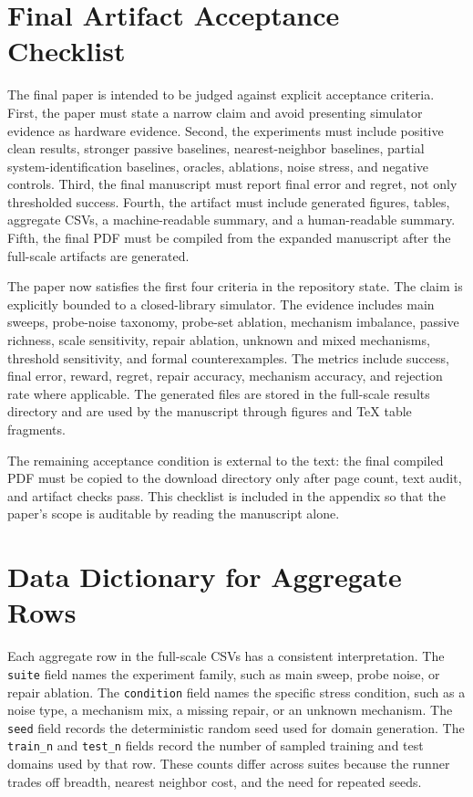 \documentclass{article}
\begin{document}
\section{Final Artifact Acceptance Checklist}

The final paper is intended to be judged against explicit acceptance criteria.
First, the paper must state a narrow claim and avoid presenting simulator
evidence as hardware evidence. Second, the experiments must include positive
clean results, stronger passive baselines, nearest-neighbor baselines, partial
system-identification baselines, oracles, ablations, noise stress, and negative
controls. Third, the final manuscript must report final error and regret, not
only thresholded success. Fourth, the artifact must include generated figures,
tables, aggregate CSVs, a machine-readable summary, and a human-readable
summary. Fifth, the final PDF must be compiled from the expanded manuscript
after the full-scale artifacts are generated.

The paper now satisfies the first four criteria in the repository state. The
claim is explicitly bounded to a closed-library simulator. The evidence includes
main sweeps, probe-noise taxonomy, probe-set ablation, mechanism imbalance,
passive richness, scale sensitivity, repair ablation, unknown and mixed
mechanisms, threshold sensitivity, and formal counterexamples. The metrics
include success, final error, reward, regret, repair accuracy, mechanism
accuracy, and rejection rate where applicable. The generated files are stored in
the full-scale results directory and are used by the manuscript through figures
and TeX table fragments.

The remaining acceptance condition is external to the text: the final compiled
PDF must be copied to the download directory only after page count, text audit,
and artifact checks pass. This checklist is included in the appendix so that the
paper's scope is auditable by reading the manuscript alone.

\clearpage

\section{Data Dictionary for Aggregate Rows}

Each aggregate row in the full-scale CSVs has a consistent interpretation. The
\texttt{suite} field names the experiment family, such as main sweep, probe
noise, or repair ablation. The \texttt{condition} field names the specific
stress condition, such as a noise type, a mechanism mix, a missing repair, or an
unknown mechanism. The \texttt{seed} field records the deterministic random seed
used for domain generation. The \texttt{train\_n} and \texttt{test\_n} fields
record the number of sampled training and test domains used by that row. These
counts differ across suites because the runner trades off breadth, nearest
neighbor cost, and the need for repeated seeds.
\end{document}
